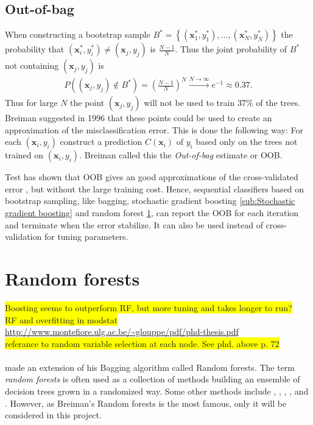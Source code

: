 \subsection{Out-of-bag}
\label{sub:Out-of-bag}
When constructing a bootstrap sample $B^* = \left\{ (\mathbf{x}_1^*, y_1^*), \ldots, (\mathbf{x}_N^*, y_N^*) \right\}$ the probability that $(\mathbf{x}_i^*, y_i^*) \neq (\mathbf{x}_j, y_j)$ is $\frac{N-1}{N}$. Thus the joint probability of $B^*$ not containing $(\mathbf{x}_j, y_j)$ is 
\begin{align}
  P\left(  (\mathbf{x}_j, y_j) \notin B^*\right) = \left( \frac{N-1}{N}  \right)^N
  \xrightarrow{N \rightarrow \infty} e^{-1} \approx 0.37. 
\end{align}
Thus for large $N$ the point $(\mathbf{x}_j, y_j)$ will not be used to train $37 \%$ of the trees. Breiman suggested in 1996 \cite{outOfBag} that these points could be used to create an approximation of the misclassification error. This is done the following way: For each $(\mathbf{x}_i, y_i)$ construct a prediction $C(\mathbf{x}_i)$ of $y_i$ based only on the trees not trained on $(\mathbf{x}_i, y_i)$. Breiman called this the \textit{Out-of-bag} estimate or OOB. 

Test has shown that OOB gives an good approximations of the cross-validated error \cite{outOfBag}, but without the large training cost. 
Hence, sequential classifiers based on bootstrap sampling, like bagging, stochastic gradient boosting \ref{sub:Stochastic gradient boosting} and random forest \ref{sec:Random forests}, can report the OOB for each iteration and terminate when the error stabilize. It can also be used instead of cross-validation for tuning parameters.


\section{Random forests}
\label{sec:Random forests}
\colorbox{yellow}{Boosting seems to outperform RF, but more tuning and takes longer to run?} \\
\colorbox{yellow}{RF and overfitting in modstat}\\
\url{http://www.montefiore.ulg.ac.be/~glouppe/pdf/phd-thesis.pdf} \\
\colorbox{yellow}{referance to random variable selection at each node. See phd. above p. 72} \\
\\
\cite{randomforests} made an extension of his Bagging algorithm called Random forests. The term \textit{random forests} is often used as a collection of methods building an ensemble of decision trees grown in a randomized way. Some other methods include \cite{dietterich1995}, \cite{Amit1997}, \cite{ho1998random}, \cite{cutler2001pert}, \cite{Geurts2006} and \cite{Rodriguez2006}. 
However, as Breiman's Random forests is the most famous, only it will be considered in this project.  

